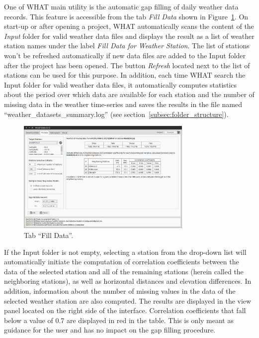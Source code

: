 \documentclass[WHATMANUAL.tex]{subfiles}
\begin{document}
One of WHAT main utility is the automatic gap filling of daily weather data records. This feature is accessible from the tab \emph{Fill Data} shown in Figure~\ref{fig:tab_fillData}. On start-up or after opening a project, WHAT automatically scans the content of the \emph{Input} folder for valid weather data files and displays the result as a list of weather station names under the label \emph{Fill Data for Weather Station}. The list of stations won't be refreshed automatically if new data files are added to the Input folder after the project has been opened. The button \emph{Refresh} located next to the list of stations can be used for this purpose. In addition, each time WHAT search the Input folder for valid weather data files, it automatically computes statistics about the period over which data are available for each station and the number of missing data in the weather time-series and saves the results in the file named ``weather\_datasets\_summary.log'' (see section~\ref{subsec:folder_structure}).

\begin{figure}[!ht]
\centering
\includegraphics[width=0.75\textwidth]{img/WHAT_Screenshot001}
\caption[Tab ``Fill Data''.]{Tab ``Fill Data''.}
\label{fig:tab_fillData}
\end{figure}

If the Input folder is not empty, selecting a station from the drop-down list will automatically initiate the computation of correlation coefficients between the data of the selected station and all of the remaining stations (herein called the neighboring stations), as well as horizontal distances and elevation differences. In addition, information about the number of missing values in the data of the selected weather station are also computed. The results are displayed in the view panel located on the right side of the interface. Correlation coefficients that fall below a value of 0.7 are displayed in red in the table. This is only meant as guidance for the user and has no impact on the gap filling procedure.
\end{document}
